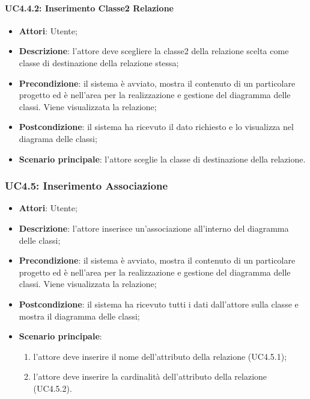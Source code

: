\paragraph{UC4.4.2: Inserimento Classe2 Relazione}
\label{UC4.4.2}
\begin{itemize}
	\item \textbf{Attori}: Utente;
	\item \textbf{Descrizione}: l'attore deve scegliere la classe2 della relazione scelta come classe di destinazione della relazione stessa;
	\item \textbf{Precondizione}: il sistema è avviato, mostra il contenuto di un particolare progetto ed è nell'area per la realizzazione e gestione del diagramma delle classi. Viene visualizzata la relazione;
	\item \textbf{Postcondizione}: il sistema ha ricevuto il dato richiesto e lo visualizza nel diagrama delle classi;
	\item \textbf{Scenario principale}: l'attore sceglie la classe di destinazione della relazione.
\end{itemize}

\subsubsection{UC4.5: Inserimento Associazione}
\label{UC4.5}
\begin{itemize}
	\item \textbf{Attori}: Utente;
	\item \textbf{Descrizione}: l'attore inserisce un'associazione all'interno del diagramma delle classi;
	\item \textbf{Precondizione}: il sistema è avviato, mostra il contenuto di un particolare progetto ed è nell'area per la realizzazione e gestione del diagramma delle classi. Viene visualizzata la relazione;
	\item \textbf{Postcondizione}: il sistema ha ricevuto tutti i dati dall'attore sulla classe e mostra il diagramma delle classi;
	\item \textbf{Scenario principale}:
	\begin{enumerate}
		\item l'attore deve inserire il nome dell'attributo della relazione (UC4.5.1);
		\item l'attore deve inserire la cardinalità dell'attributo della relazione (UC4.5.2).
	\end{enumerate}
\end{itemize}

